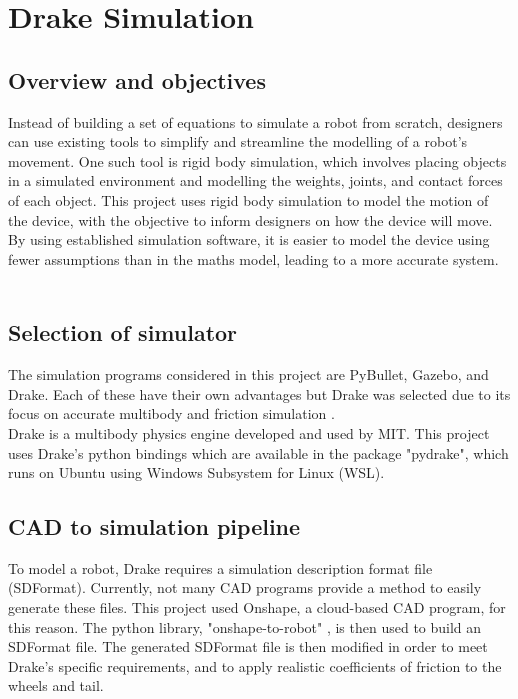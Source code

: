 \chapter{Drake Simulation}

\section{Overview and objectives}

Instead of building a set of equations to simulate a robot from scratch, designers can use existing tools to simplify and streamline the modelling of a robot's movement. One such tool is rigid body simulation, which involves placing objects in a simulated environment and modelling the weights, joints, and contact forces of each object. This project uses rigid body simulation to model the motion of the device, with the objective to inform designers on how the device will move. By using established simulation software, it is easier to model the device using fewer assumptions than in the maths model, leading to a more accurate system.\\
\\
\section{Selection of simulator}
The simulation programs considered in this project are PyBullet, Gazebo, and Drake. Each of these have their own advantages but Drake was selected due to its focus on accurate multibody and friction simulation \citep{drake}.
\\
Drake is a multibody physics engine developed and used by MIT. This project uses Drake's python bindings which are available in the package "pydrake", which runs on Ubuntu using Windows Subsystem for Linux (WSL).\\
\section{CAD to simulation pipeline}
To model a robot, Drake requires a simulation description format file (SDFormat). Currently, not many CAD programs provide a method to easily generate these files. This project used Onshape, a cloud-based CAD program, for this reason. The python library, "onshape-to-robot" \citep{converter}, is then used to build an SDFormat file. The generated SDFormat file is then modified in order to meet Drake's specific requirements, and to apply realistic coefficients of friction to the wheels and tail.\\

